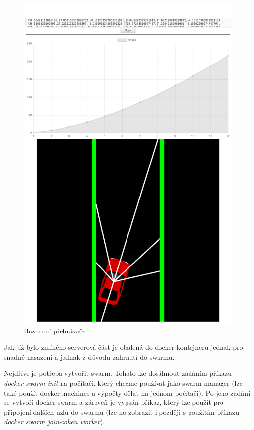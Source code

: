 \begin{figure}[H]
	\centering
	\includegraphics[width=0.4\linewidth]{player}
	\caption{Rozhraní přehrávače}
	\label{fig:player}
\end{figure}


Jak jíž bylo zmíněno serverová část je obalená do docker kontejneru jednak pro snadné nasazení a jednak z důvodu zahrnutí do swarmu.	

Nejdříve je potřeba vytvořit swarm. Tohoto lze dosáhnout zadáním příkazu \emph{docker swarm init} na počítači, který chceme používat jako swarm manager (lze také použít docker-machines a výpočty dělat na jednom počítači). Po jeho zadání se vytvoří docker swarm a zároveň je vypsán příkaz, který lze použít pro připojení dalších uzlů do swarmu (lze ho zobrazit i později s použitím příkazu \emph{docker swarm join-token worker}).


